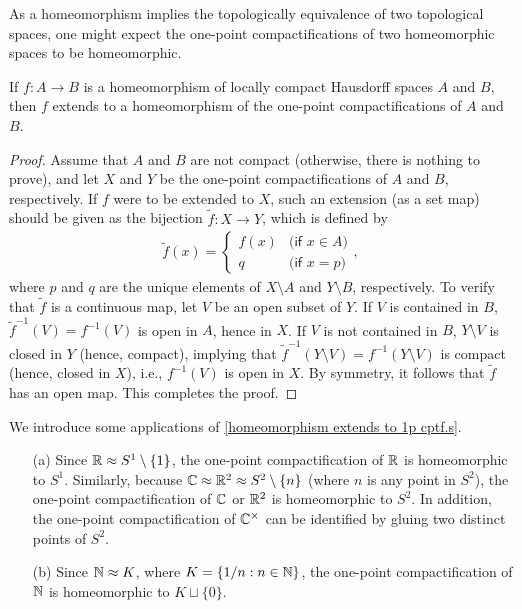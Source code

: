 As a homeomorphism implies the topologically equivalence of two topological spaces, one might expect the one-point compactifications of two homeomorphic spaces to be homeomorphic.
\begin{thm}\label{homeomorphism extends to 1p cptf.s}
    If $f: A\rightarrow B$ is a homeomorphism of locally compact Hausdorff spaces $A$ and $B$, then $f$ extends to a homeomorphism of the one-point compactifications of $A$ and $B$.
\end{thm}
\begin{proof}
    Assume that $A$ and $B$ are not compact (otherwise, there is nothing to prove), and let $X$ and $Y$ be the one-point compactifications of $A$ and $B$, respectively.
    If $f$ were to be extended to $X$, such an extension (as a set map) should be given as the bijection $\widetilde{f}: X\rightarrow Y$, which is defined by
    \begin{align*}
        \widetilde{f}(x)=\left\{\begin{array}{cc}
            f(x)    &   \textsf{(if $x\in A$)}\\
            q       &   \textsf{(if $x=p$)}
        \end{array}\right.,
    \end{align*}
    where $p$ and $q$ are the unique elements of $X\setminus A$ and $Y\setminus B$, respectively.
    To verify that $\widetilde{f}$ is a continuous map, let $V$ be an open subset of $Y$.
    If $V$ is contained in $B$, $\widetilde{f}^{-1}(V)=f^{-1}(V)$ is open in $A$, hence in $X$.
    If $V$ is not contained in $B$, $Y\setminus V$ is closed in $Y$ (hence, compact), implying that $\widetilde{f}^{-1}(Y\setminus V)=f^{-1}(Y\setminus V)$ is compact (hence, closed in $X$), i.e., $f^{-1}(V)$ is open in $X$.
    By symmetry, it follows that $\widetilde{f}$ has an open map.
    This completes the proof.
\end{proof}
\begin{exmp}
    We introduce some applications of \cref{homeomorphism extends to 1p cptf.s}.
    \begin{enumerate}
        \item[(a)]
        {
            Since ${\mathbb{R}}\approx S^1\setminus\{1\}$, the one-point compactification of ${\mathbb{R}}$ is homeomorphic to $S^1$.
            Similarly, because ${\mathbb{C}}\approx{\mathbb{R}}^2\approx S^2\setminus\{n\}$ (where $n$ is any point in $S^2$), the one-point compactification of ${\mathbb{C}}$ or ${\mathbb{R}}^2$ is homeomorphic to $S^2$.
            In addition, the one-point compactification of ${\mathbb{C}}^\times$ can be identified by gluing two distinct points of $S^2$.
        }
        \item[(b)]
        {
            Since ${\mathbb{N}}\approx K$, where $K=\left\{1/n: n\in{\mathbb{N}}\right\}$, the one-point compactification of ${\mathbb{N}}$ is homeomorphic to $K\sqcup\{0\}$.
        }
    \end{enumerate}
\end{exmp}